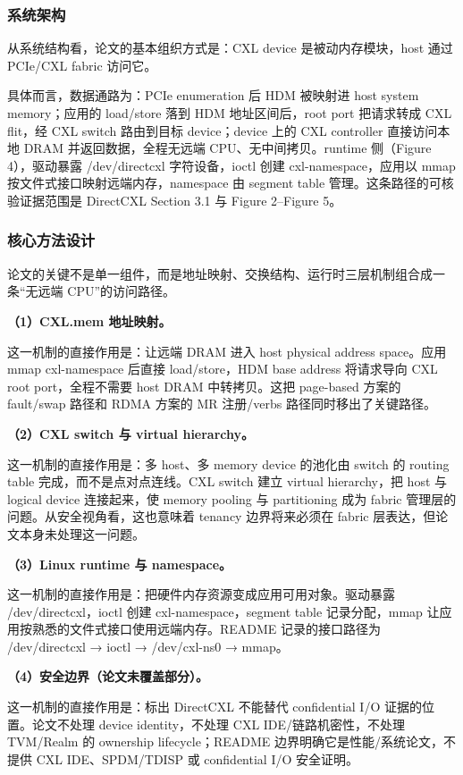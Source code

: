 \documentclass[11pt]{ctexart}
\begin{document}
\subsubsection{系统架构}
从系统结构看，论文的基本组织方式是：CXL device 是被动内存模块，host 通过 PCIe/CXL fabric 访问它。\par
具体而言，数据通路为：PCIe enumeration 后 HDM 被映射进 host system memory；应用的 load/store 落到 HDM 地址区间后，root port 把请求转成 CXL flit，经 CXL switch 路由到目标 device；device 上的 CXL controller 直接访问本地 DRAM 并返回数据，全程无远端 CPU、无中间拷贝。runtime 侧（Figure 4），驱动暴露 /dev/directcxl 字符设备，ioctl 创建 cxl-namespace，应用以 mmap 按文件式接口映射远端内存，namespace 由 segment table 管理。这条路径的可核验证据范围是 DirectCXL Section 3.1 与 Figure 2--Figure 5。\par
\subsubsection{核心方法设计}
论文的关键不是单一组件，而是地址映射、交换结构、运行时三层机制组合成一条“无远端 CPU”的访问路径。\par
\noindent\textbf{（1）CXL.mem 地址映射。}\par
这一机制的直接作用是：让远端 DRAM 进入 host physical address space。应用 mmap cxl-namespace 后直接 load/store，HDM base address 将请求导向 CXL root port，全程不需要 host DRAM 中转拷贝。这把 page-based 方案的 fault/swap 路径和 RDMA 方案的 MR 注册/verbs 路径同时移出了关键路径。\par
\noindent\textbf{（2）CXL switch 与 virtual hierarchy。}\par
这一机制的直接作用是：多 host、多 memory device 的池化由 switch 的 routing table 完成，而不是点对点连线。CXL switch 建立 virtual hierarchy，把 host 与 logical device 连接起来，使 memory pooling 与 partitioning 成为 fabric 管理层的问题。从安全视角看，这也意味着 tenancy 边界将来必须在 fabric 层表达，但论文本身未处理这一问题。\par
\noindent\textbf{（3）Linux runtime 与 namespace。}\par
这一机制的直接作用是：把硬件内存资源变成应用可用对象。驱动暴露 /dev/directcxl，ioctl 创建 cxl-namespace，segment table 记录分配，mmap 让应用按熟悉的文件式接口使用远端内存。README 记录的接口路径为 /dev/directcxl → ioctl → /dev/cxl-ns0 → mmap。\par
\noindent\textbf{（4）安全边界（论文未覆盖部分）。}\par
这一机制的直接作用是：标出 DirectCXL 不能替代 confidential I/O 证据的位置。论文不处理 device identity，不处理 CXL IDE/链路机密性，不处理 TVM/Realm 的 ownership lifecycle；README 边界明确它是性能/系统论文，不提供 CXL IDE、SPDM/TDISP 或 confidential I/O 安全证明。\par
\end{document}
